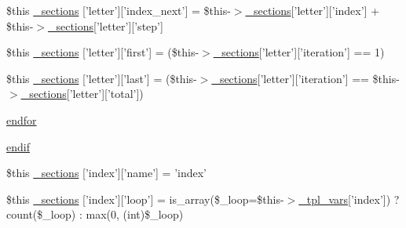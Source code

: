 \begin{DoxyCompactItemize}
\item 
\$this \hyperlink{34d6fa4bfd5eef6424a9ddc74a166350_2_06_06-19_05_06_06-1910644431_05basicindex_8tpl_8php_a4debc053dc2f3efa7fea6f04fa91cd0f}{\-\_\-sections} \mbox{[}'letter'\mbox{]}\mbox{[}'index\-\_\-next'\mbox{]} = \$this-\/$>$\hyperlink{_06_06127_05_06_0612781687_05pkgelementindex_8tpl_8php_a9e3d26b39edfe29c3f29b8035ef33828}{\-\_\-sections}\mbox{[}'letter'\mbox{]}\mbox{[}'index'\mbox{]} + \$this-\/$>$\hyperlink{_06_06127_05_06_0612781687_05pkgelementindex_8tpl_8php_a9e3d26b39edfe29c3f29b8035ef33828}{\-\_\-sections}\mbox{[}'letter'\mbox{]}\mbox{[}'step'\mbox{]}
\item 
\$this \hyperlink{34d6fa4bfd5eef6424a9ddc74a166350_2_06_06-19_05_06_06-1910644431_05basicindex_8tpl_8php_ab9d257a2015bf9499601c3f9461e868e}{\-\_\-sections} \mbox{[}'letter'\mbox{]}\mbox{[}'first'\mbox{]} = (\$this-\/$>$\hyperlink{_06_06127_05_06_0612781687_05pkgelementindex_8tpl_8php_a9e3d26b39edfe29c3f29b8035ef33828}{\-\_\-sections}\mbox{[}'letter'\mbox{]}\mbox{[}'iteration'\mbox{]} == 1)
\item 
\$this \hyperlink{34d6fa4bfd5eef6424a9ddc74a166350_2_06_06-19_05_06_06-1910644431_05basicindex_8tpl_8php_ad687d1fc356ce0cf84c4217e60ae2a1d}{\-\_\-sections} \mbox{[}'letter'\mbox{]}\mbox{[}'last'\mbox{]} = (\$this-\/$>$\hyperlink{_06_06127_05_06_0612781687_05pkgelementindex_8tpl_8php_a9e3d26b39edfe29c3f29b8035ef33828}{\-\_\-sections}\mbox{[}'letter'\mbox{]}\mbox{[}'iteration'\mbox{]} == \$this-\/$>$\hyperlink{_06_06127_05_06_0612781687_05pkgelementindex_8tpl_8php_a9e3d26b39edfe29c3f29b8035ef33828}{\-\_\-sections}\mbox{[}'letter'\mbox{]}\mbox{[}'total'\mbox{]})
\item 
\hyperlink{34d6fa4bfd5eef6424a9ddc74a166350_2_06_06-19_05_06_06-1910644431_05basicindex_8tpl_8php_ae8fdc27183f296411bac00ed522ee1ac}{endfor}
\item 
\hyperlink{34d6fa4bfd5eef6424a9ddc74a166350_2_06_06-19_05_06_06-1910644431_05basicindex_8tpl_8php_a82cd33ca97ff99f2fcc5e9c81d65251b}{endif}
\item 
\$this \hyperlink{34d6fa4bfd5eef6424a9ddc74a166350_2_06_06-19_05_06_06-1910644431_05basicindex_8tpl_8php_a4be17fc57e77c382f51f873fc85f607c}{\-\_\-sections} \mbox{[}'index'\mbox{]}\mbox{[}'name'\mbox{]} = 'index'
\item 
\$this \hyperlink{34d6fa4bfd5eef6424a9ddc74a166350_2_06_06-19_05_06_06-1910644431_05basicindex_8tpl_8php_a75ddf704ebb80010a1e7d184b4be4b4e}{\-\_\-sections} \mbox{[}'index'\mbox{]}\mbox{[}'loop'\mbox{]} = is\-\_\-array(\$\-\_\-loop=\$this-\/$>$\hyperlink{_06_06127_05_06_0612781687_05pkgelementindex_8tpl_8php_a4a4846d8e68d455590131a05697f67a3}{\-\_\-tpl\-\_\-vars}\mbox{[}'index'\mbox{]}) ? count(\$\-\_\-loop) \-: max(0, (int)\$\-\_\-loop)

\end{DoxyCompactItemize}
